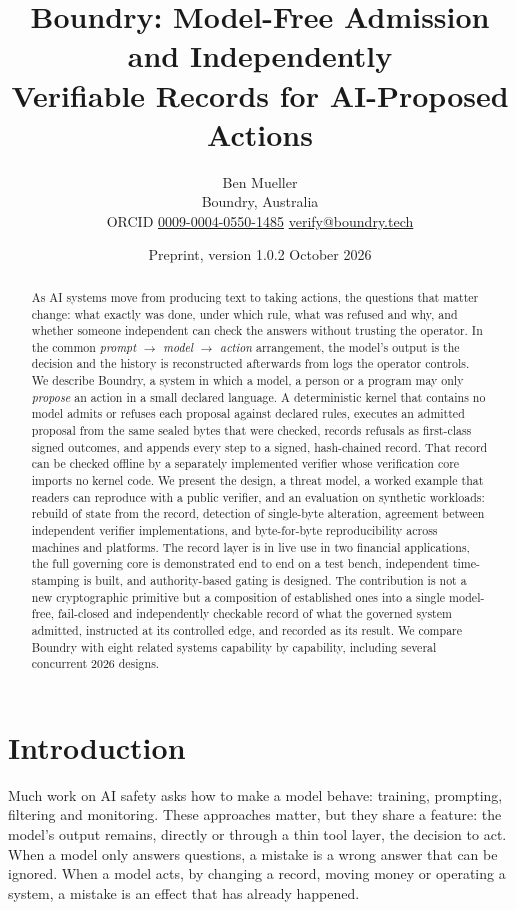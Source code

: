 \documentclass[11pt,a4paper]{article}
\title{\textbf{Boundry: Model-Free Admission and Independently\\Verifiable Records for AI-Proposed Actions}}
\author{Ben Mueller\\[2pt]
\small Boundry, Australia\\
\small ORCID \href{https://orcid.org/0009-0004-0550-1485}{0009-0004-0550-1485} \quad
\href{mailto:verify@boundry.tech}{verify@boundry.tech}}
\date{\small Preprint, version 1.0.2 \quad October 2026}
\begin{document}
\maketitle

\begin{abstract}
\noindent As AI systems move from producing text to taking actions, the questions that matter change: what exactly was done, under which rule, what was refused and why, and whether someone independent can check the answers without trusting the operator. In the common \emph{prompt $\rightarrow$ model $\rightarrow$ action} arrangement, the model's output is the decision and the history is reconstructed afterwards from logs the operator controls. We describe Boundry, a system in which a model, a person or a program may only \emph{propose} an action in a small declared language. A deterministic kernel that contains no model admits or refuses each proposal against declared rules, executes an admitted proposal from the same sealed bytes that were checked, records refusals as first-class signed outcomes, and appends every step to a signed, hash-chained record. That record can be checked offline by a separately implemented verifier whose verification core imports no kernel code. We present the design, a threat model, a worked example that readers can reproduce with a public verifier, and an evaluation on synthetic workloads: rebuild of state from the record, detection of single-byte alteration, agreement between independent verifier implementations, and byte-for-byte reproducibility across machines and platforms. The record layer is in live use in two financial applications, the full governing core is demonstrated end to end on a test bench, independent time-stamping is built, and authority-based gating is designed. The contribution is not a new cryptographic primitive but a composition of established ones into a single model-free, fail-closed and independently checkable record of what the governed system admitted, instructed at its controlled edge, and recorded as its result. We compare Boundry with eight related systems capability by capability, including several concurrent 2026 designs.
\end{abstract}

\section{Introduction}

Much work on AI safety asks how to make a model behave: training, prompting, filtering and monitoring. These approaches matter, but they share a feature: the model's output remains, directly or through a thin tool layer, the decision to act. When a model only answers questions, a mistake is a wrong answer that can be ignored. When a model acts, by changing a record, moving money or operating a system, a mistake is an effect that has already happened.
\end{document}
